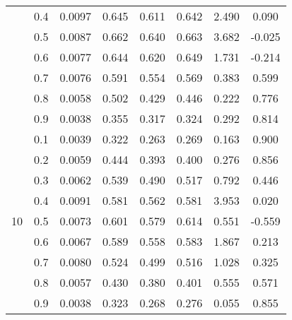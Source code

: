 \documentclass[11pt,a4paper]{report}
\begin{document}
\begin{longtable}{ | c | c || c | c | c | c | c | c | }
 & 0.4 & 0.0097 & 0.645 & 0.611 & 0.642 & 2.490 & 0.090 \\
 & 0.5 & 0.0087 & 0.662 & 0.640 & 0.663 & 3.682 & -0.025 \\
 & 0.6 & 0.0077 & 0.644 & 0.620 & 0.649 & 1.731 & -0.214 \\
 & 0.7 & 0.0076 & 0.591 & 0.554 & 0.569 & 0.383 & 0.599 \\
 & 0.8 & 0.0058 & 0.502 & 0.429 & 0.446 & 0.222 & 0.776 \\
 & 0.9 & 0.0038 & 0.355 & 0.317 & 0.324 & 0.292 & 0.814 \\
 \hline
\multirow{9}{*}{10} & 0.1 & 0.0039 & 0.322 & 0.263 & 0.269 & 0.163 & 0.900 \\
 & 0.2 & 0.0059 & 0.444 & 0.393 & 0.400 & 0.276 & 0.856 \\
 & 0.3 & 0.0062 & 0.539 & 0.490 & 0.517 & 0.792 & 0.446 \\
 & 0.4 & 0.0091 & 0.581 & 0.562 & 0.581 & 3.953 & 0.020 \\
 & 0.5 & 0.0073 & 0.601 & 0.579 & 0.614 & 0.551 & -0.559 \\
 & 0.6 & 0.0067 & 0.589 & 0.558 & 0.583 & 1.867 & 0.213 \\
 & 0.7 & 0.0080 & 0.524 & 0.499 & 0.516 & 1.028 & 0.325 \\
 & 0.8 & 0.0057 & 0.430 & 0.380 & 0.401 & 0.555 & 0.571 \\
 & 0.9 & 0.0038 & 0.323 & 0.268 & 0.276 & 0.055 & 0.855 \\
 \hline
\hline
\end{longtable}
\end{document}
